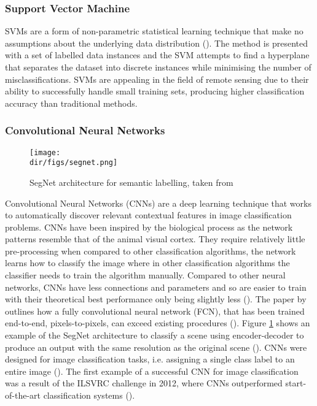 \subsubsection{Support Vector Machine}
SVMs are a form of non-parametric statistical learning technique that make no assumptions about the underlying data distribution (\cite{vapnik82}). The method is presented with a set of labelled data instances and the SVM attempts to find a hyperplane that separates the dataset into discrete instances while minimising the number of misclassifications. SVMs are appealing in the field of remote sensing due to their ability to successfully handle small training sets, producing higher classification accuracy than traditional methods.
\subsubsection{Convolutional Neural Networks}
\begin{figure}[b]
    \centering
    \texttt{[image: \\dir/figs/segnet.png]}
    \caption{SegNet architecture for semantic labelling, taken from \cite{audebert18}}
    \label{fig.segnet}
\end{figure}
\par
Convolutional Neural Networks (CNNs) are a deep learning technique that works to automatically discover relevant contextual features in image classification problems.
CNNs have been inspired by the biological process as the network patterns resemble that of the animal visual cortex. They require relatively little pre-processing when compared to other classification algorithms, the network learns how to classify the image where in other classification algorithms the classifier needs to train the algorithm manually. Compared to other neural networks, CNNs have less connections and parameters and so are easier to train with their theoretical best performance only being slightly less (\cite{krizhevsky17}). The paper by \cite{long15} outlines how a fully convolutional neural network (FCN), that has been trained end-to-end, pixels-to-pixels, can exceed existing procedures (\cite{shelhamer17}). Figure \ref{fig.segnet} shows an example of the SegNet architecture to classify a scene using encoder-decoder to produce an output with the same resolution as the original scene (\cite{audebert18}). CNNs were designed for image classification tasks, i.e. assigning a single class label to an entire image (\cite{volpi17}). The first example of a successful CNN for image classification was a result of the ILSVRC challenge in 2012, where CNNs outperformed start-of-the-art classification systems (\cite{marmanis16,volpi17,krizhevsky17}).
